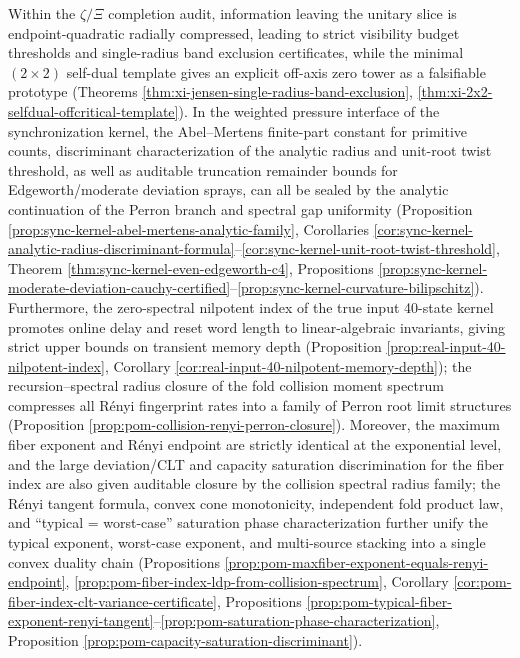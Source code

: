 Within the \(\zeta/\Xi\) completion audit, information leaving the unitary slice is endpoint-quadratic radially compressed, leading to strict visibility budget thresholds and single-radius band exclusion certificates, while the minimal \((2\times2)\) self-dual template gives an explicit off-axis zero tower as a falsifiable prototype (Theorems \ref{thm:xi-jensen-single-radius-band-exclusion}, \ref{thm:xi-2x2-selfdual-offcritical-template}).
In the weighted pressure interface of the synchronization kernel, the Abel--Mertens finite-part constant for primitive counts, discriminant characterization of the analytic radius and unit-root twist threshold, as well as auditable truncation remainder bounds for Edgeworth/moderate deviation sprays, can all be sealed by the analytic continuation of the Perron branch and spectral gap uniformity (Proposition \ref{prop:sync-kernel-abel-mertens-analytic-family}, Corollaries \ref{cor:sync-kernel-analytic-radius-discriminant-formula}--\ref{cor:sync-kernel-unit-root-twist-threshold}, Theorem \ref{thm:sync-kernel-even-edgeworth-c4}, Propositions \ref{prop:sync-kernel-moderate-deviation-cauchy-certified}--\ref{prop:sync-kernel-curvature-bilipschitz}).
Furthermore, the zero-spectral nilpotent index of the true input 40-state kernel promotes online delay and reset word length to linear-algebraic invariants, giving strict upper bounds on transient memory depth (Proposition \ref{prop:real-input-40-nilpotent-index}, Corollary \ref{cor:real-input-40-nilpotent-memory-depth}); the recursion--spectral radius closure of the fold collision moment spectrum compresses all R\'{e}nyi fingerprint rates into a family of Perron root limit structures (Proposition \ref{prop:pom-collision-renyi-perron-closure}).
Moreover, the maximum fiber exponent and R\'{e}nyi endpoint are strictly identical at the exponential level, and the large deviation/CLT and capacity saturation discrimination for the fiber index are also given auditable closure by the collision spectral radius family; the R\'{e}nyi tangent formula, convex cone monotonicity, independent fold product law, and ``typical = worst-case'' saturation phase characterization further unify the typical exponent, worst-case exponent, and multi-source stacking into a single convex duality chain (Propositions \ref{prop:pom-maxfiber-exponent-equals-renyi-endpoint}, \ref{prop:pom-fiber-index-ldp-from-collision-spectrum}, Corollary \ref{cor:pom-fiber-index-clt-variance-certificate}, Propositions \ref{prop:pom-typical-fiber-exponent-renyi-tangent}--\ref{prop:pom-saturation-phase-characterization}, Proposition \ref{prop:pom-capacity-saturation-discriminant}).
